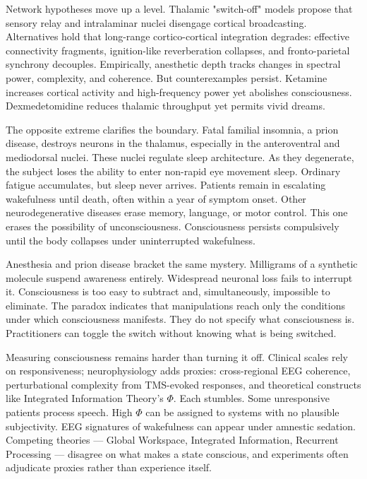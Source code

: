 Network hypotheses move up a level. Thalamic "switch-off" models propose that sensory relay and intralaminar nuclei disengage cortical broadcasting. Alternatives hold that long-range cortico-cortical integration degrades: effective connectivity fragments, ignition-like reverberation collapses, and fronto-parietal synchrony decouples. Empirically, anesthetic depth tracks changes in spectral power, complexity, and coherence. But counterexamples persist. Ketamine increases cortical activity and high-frequency power yet abolishes consciousness. Dexmedetomidine reduces thalamic throughput yet permits vivid dreams.

The opposite extreme clarifies the boundary. Fatal familial insomnia, a prion disease, destroys neurons in the thalamus, especially in the anteroventral and mediodorsal nuclei. These nuclei regulate sleep architecture. As they degenerate, the subject loses the ability to enter non-rapid eye movement sleep. Ordinary fatigue accumulates, but sleep never arrives. Patients remain in escalating wakefulness until death, often within a year of symptom onset. Other neurodegenerative diseases erase memory, language, or motor control. This one erases the possibility of unconsciousness. Consciousness persists compulsively until the body collapses under uninterrupted wakefulness.

Anesthesia and prion disease bracket the same mystery. Milligrams of a synthetic molecule suspend awareness entirely. Widespread neuronal loss fails to interrupt it. Consciousness is too easy to subtract and, simultaneously, impossible to eliminate. The paradox indicates that manipulations reach only the conditions under which consciousness manifests. They do not specify what consciousness is. Practitioners can toggle the switch without knowing what is being switched.

Measuring consciousness remains harder than turning it off. Clinical scales rely on responsiveness; neurophysiology adds proxies: cross-regional EEG coherence, perturbational complexity from TMS-evoked responses, and theoretical constructs like Integrated Information Theory's $\Phi$. Each stumbles. Some unresponsive patients process speech. High $\Phi$ can be assigned to systems with no plausible subjectivity. EEG signatures of wakefulness can appear under amnestic sedation. Competing theories — Global Workspace, Integrated Information, Recurrent Processing — disagree on what makes a state conscious, and experiments often adjudicate proxies rather than experience itself.

